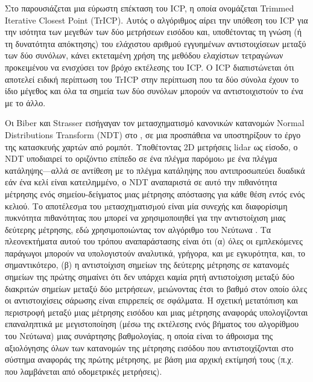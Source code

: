Στο \cite{Chetverikova} παρουσιάζεται μια εύρωστη επέκταση του ICP, η οποία
ονομάζεται Trimmed Iterative Closest Point (TrICP). Αυτός ο αλγόριθμος αίρει
την υπόθεση του ICP για την ισότητα των μεγεθών των δύο μετρήσεων εισόδου και,
υποθέτοντας τη γνώση (ή τη δυνατότητα απόκτησης) του ελάχιστου αριθμού
εγγυημένων αντιστοιχίσεων μεταξύ των δύο συνόλων, κάνει εκτεταμένη χρήση της
μεθόδου ελαχίστων τετραγώνων \cite{Rousseeuw1984} προκειμένου να ενισχύσει
τον βρόχο εκτέλεσης του ICP.  Ο ICP διαπιστώνεται ότι αποτελεί ειδική περίπτωση
του TrICP στην περίπτωση που τα δύο σύνολα έχουν το ίδιο μέγεθος και όλα τα
σημεία των δύο συνόλων μπορούν να αντιστοιχιστούν το ένα με το άλλο.

Οι Biber και Strasser εισήγαγαν τον μετασχηματισμό κανονικών κατανομών Normal
Distributions Transform (NDT) στο \cite{Bibera}, σε μια προσπάθεια να
υποστηρίξουν το έργο της κατασκευής χαρτών από ρομπότ. Υποθέτοντας 2D μετρήσεις
lidar ως είσοδο, ο NDT υποδιαιρεί το οριζόντιο επίπεδο σε ένα πλέγμα παρόμοιo
με ένα πλέγμα κατάληψης---αλλά σε αντίθεση με το πλέγμα κατάληψης που
αντιπροσωπεύει δυαδικά εάν ένα κελί είναι κατειλημμένο, ο NDT αναπαριστά
σε αυτό την πιθανότητα μέτρησης ενός σημείου-δείγματος μιας μέτρησης απόστασης
για κάθε θέση \textit{εντός} ενός κελιού. Το αποτέλεσµα του µετασχηµατισµού
είναι μία συνεχής και διαφορίσιμη πυκνότητα πιθανότητας που μπορεί να
χρησιμοποιηθεί για την αντιστοίχιση μιας δεύτερης μέτρησης, εδώ χρησιμοποιώντας
τον αλγόριθμο του Νεύτωνα \cite{Suli2003}. Τα πλεονεκτήματα αυτού του τρόπου
αναπαράστασης είναι ότι (α) όλες οι εμπλεκόμενες παράγωγοι μπορούν να
υπολογιστούν αναλυτικά, γρήγορα, και με εγκυρότητα, και, το σημαντικότερο, (β)
η αντιστοίχιση σημείων της δεύτερης μέτρησης σε κατανομές σημείων της πρώτης
σημαίνει ότι δεν υπάρχει καμία ρητή αντιστοίχιση μεταξύ δύο διακριτών σημείων
μεταξύ δύο μετρήσεων, μειώνοντας έτσι το βαθμό στον οποίο όλες οι
αντιστοιχίσεις σάρωσης είναι επιρρεπείς σε σφάλματα. Η σχετική μετατόπιση και
περιστροφή μεταξύ μιας μέτρησης εισόδου και μιας μέτρησης αναφοράς
υπολογίζονται επαναληπτικά με μεγιστοποίηση (μέσω της εκτέλεσης ενός βήματος
του αλγορίθμου του Νεύτωνα) μιας συνάρτησης βαθμολογίας, η οποία είναι το
άθροισμα της αξιολόγησης όλων των κατανομών της μέτρησης εισόδου που
αντιστοιχίζονται στο σύστημα αναφοράς της πρώτης μέτρησης, με βάση μια αρχική
εκτίμησή τους (π.χ. που λαμβάνεται από οδομετρικές μετρήσεις).

